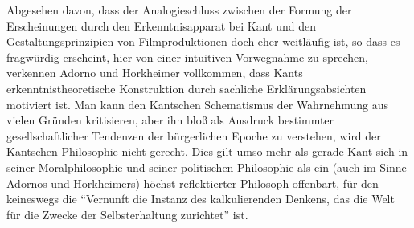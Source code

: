 \documentclass[12pt,a4paper,ngerman]{article}
\begin{document}
Abgesehen davon, dass der Analogieschluss zwischen der Formung der
Erscheinungen durch den Erkenntnisapparat bei Kant und den
Gestaltungsprinzipien von Filmproduktionen doch eher weitläufig ist, so dass
es fragwürdig erscheint, hier von einer intuitiven Vorwegnahme zu sprechen,
verkennen Adorno und Horkheimer vollkommen, dass Kants erkenntnistheoretische
Konstruktion durch sachliche Erklärungsabsichten motiviert ist. Man kann den
Kantschen Schematismus der Wahrnehmung aus vielen Gründen kritisieren, aber
ihn bloß als Ausdruck bestimmter gesellschaftlicher Tendenzen der bürgerlichen
Epoche zu verstehen, wird der Kantschen Philosophie nicht gerecht. Dies gilt
umso mehr als gerade Kant sich in seiner Moralphilosophie und seiner
politischen Philosophie als ein (auch im Sinne Adornos und Horkheimers) höchst
reflektierter Philosoph offenbart, für den keineswegs die "`Vernunft die
Instanz des kalkulierenden Denkens, das die Welt für die Zwecke der
Selbsterhaltung zurichtet"' \cite[S. 90]{adorno-horkheimer:1947} ist.
\end{document}
